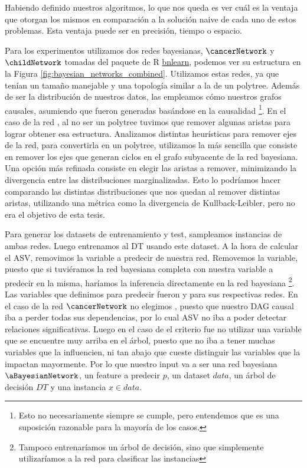 Habiendo definido nuestros algoritmos, lo que nos queda es ver cuál es la ventaja que otorgan los mismos en comparación a la solución naive de cada uno de estos problemas. Esta ventaja puede ser en precisión, tiempo o espacio. 

Para los experimentos utilizamos dos redes bayesianas, $\cancerNetwork$ y $\childNetwork$ tomadas del paquete de R \href{https://www.bnlearn.com/bnrepository/}{bnlearn}, podemos ver su estructura en la Figura \ref{fig:bayesian_networks_combined}. Utilizamos estas redes, ya que tenían un tamaño manejable y una topología similar a la de un polytree. Además de ser la distribución de nuestros datos, las empleamos cómo nuestros grafos causales, asumiendo que fueron generadas basándose en la causalidad \footnote{Esto no necesariamente siempre se cumple, pero entendemos que es una suposición razonable para la mayoría de los casos.}.
 En el caso de la red \childNetwork, al no ser un polytree tuvimos que remover algunas aristas para lograr obtener esa estructura. Analizamos distintas heurísticas para remover ejes de la red, para convertirla en un polytree, utilizamos la más sencilla que consiste en remover los ejes que generan ciclos en el grafo subyacente de la red bayesiana. Una opción más refinada consiste en elegir las aristas a remover, minimizando la divergencia entre las distribuciones marginalizadas. Esto lo podríamos hacer comparando las distintas distribuciones que nos quedan al remover distintas aristas, utilizando una métrica como la divergencia de Kullback-Leibler, pero no era el objetivo de esta tesis. 

Para generar los datasets de entrenamiento y test, sampleamos instancias de ambas redes. Luego entrenamos al DT usando este dataset. A la hora de calcular el ASV, removimos la variable a predecir de nuestra red. Removemos la variable, puesto que si tuviéramos la red bayesiana completa con nuestra variable a predecir en la misma, haríamos la inferencia directamente en la red bayesiana \footnote{Tampoco entrenaríamos un árbol de decisión, sino que simplemente utilizaríamos a la red para clasificar las instancias}. Las variables que definimos para predecir fueron  y  para sus respectivas redes. En el caso de la red $\cancerNetwork$ no elegimos , puesto que nuestro DAG causal iba a perder todas sus dependencias, por lo cual ASV no iba a poder detectar relaciones significativas. Luego en el caso de \childNetwork{} el criterio fue no utilizar una variable que se encuentre muy arriba en el árbol, puesto que no iba a tener muchas variables que la influencien, ni tan abajo que cueste distinguir las variables que la impactan mayormente. Por lo que nuestro input va a ser una red bayesiana $\aBayesianNetwork$, un feature a predecir $p$, un dataset $data$, un árbol de decisión $DT$ y una instancia $x \in data$. 

